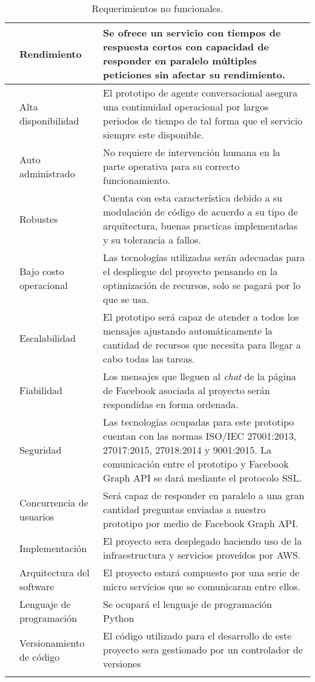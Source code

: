 \begin{longtable}[c]{| >{\centering\arraybackslash}m{2cm} | >{\centering\arraybackslash}m{4cm} | >{\centering\arraybackslash}m{6cm} |}
            1 & Rendimiento & Se ofrece un servicio con tiempos de respuesta cortos con capacidad de responder en paralelo múltiples peticiones sin afectar su rendimiento.\\ \hline 
            2 & Alta disponibilidad & El prototipo de agente conversacional asegura una continuidad operacional por largos periodos de tiempo de tal forma que el servicio siempre este disponible.  \\ \hline 
            3 & Auto administrado & No requiere de intervención humana en la parte operativa para su correcto funcionamiento.\\ \hline 
            4 & Robustes & Cuenta con esta característica debido a su modulación de código de acuerdo a su tipo de arquitectura, buenas practicas implementadas y su tolerancia a fallos. \\ \hline 
            5 & Bajo costo operacional & Las tecnologías utilizadas serán adecuadas para el despliegue del proyecto pensando en la optimización de recursos, solo se pagará por lo que se usa. \\ \hline 
            6 & Escalabilidad & El prototipo será capaz de atender a todos los mensajes ajustando automáticamente la cantidad de recursos que necesita para llegar a cabo todas las tareas. \\ \hline
            7 & Fiabilidad & Los mensajes que lleguen al \textit{chat} de la página de Facebook asociada al proyecto serán respondidas en forma ordenada. \\ \hline 
            8 & Seguridad & Las tecnologías ocupadas para este prototipo cuentan con las normas ISO/IEC 27001:2013, 27017:2015, 27018:2014 y 9001:2015. La comunicación entre el prototipo y Facebook Graph API se dará mediante el protocolo SSL.  \\ \hline
            9 & Concurrencia de usuarios & Será capaz de responder en paralelo a una gran cantidad preguntas enviadas a nuestro prototipo por medio de Facebook Graph API. \\ \hline 
            10 & Implementación & El proyecto sera desplegado haciendo uso de la infraestructura y servicios proveídos por AWS. \\ \hline 
            11 & Arquitectura del software & El proyecto estará compuesto por una serie de micro servicios que se comunicaran entre ellos. \\ \hline 
            12 & Lenguaje de programación & Se ocupará el lenguaje de programación Python\\ \hline 
            13 & Versionamiento de código & El código utilizado para el desarrollo de este proyecto sera gestionado por un controlador de versiones\\ \hline 
            \caption{Requerimientos no funcionales.\label{long}}
        \end{longtable}
\newpage
